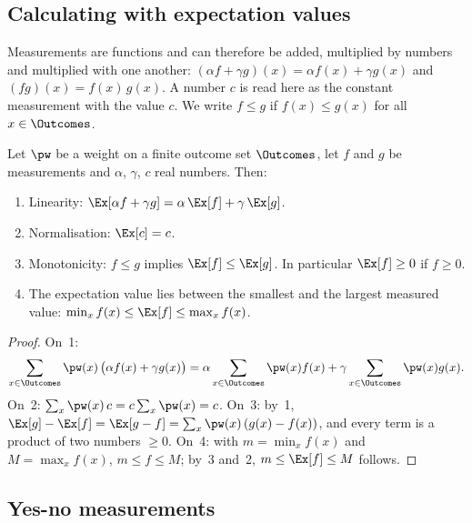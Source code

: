 \subsection{Calculating with expectation values}\label{c01.s2.2}

Measurements are functions and can therefore be added, multiplied by numbers and
multiplied with one another: $(\alpha f + \gamma g)(x) = \alpha f(x) + \gamma g(x)$ and
$(fg)(x) = f(x)\,g(x)$. A number $c$ is read here as the constant measurement with the
value $c$. We write $f \leq g$ if $f(x) \leq g(x)$ for all $x \in \Outcomes$.

\begin{proposition}\label{c01.prop.erwartung}
  Let $\pw$ be a weight on a finite outcome set $\Outcomes$, let $f$ and $g$ be
  measurements and $\alpha$, $\gamma$, $c$ real numbers. Then:
  \begin{enumerate}
    \item Linearity: $\Ex[\alpha f + \gamma g] = \alpha\, \Ex[f] + \gamma\, \Ex[g]$.
    \item Normalisation: $\Ex[c] = c$.
    \item Monotonicity: $f \leq g$ implies $\Ex[f] \leq \Ex[g]$. In particular
      $\Ex[f] \geq 0$ if $f \geq 0$.
    \item The expectation value lies between the smallest and the largest measured value:
      $\min_x f(x) \leq \Ex[f] \leq \max_x f(x)$.
  \end{enumerate}
\end{proposition}
\begin{proof}
  On~1:
  \begin{equation}\label{c01.eq.linear}
    \sum_{x \in \Outcomes} \pw(x)\,\bigl(\alpha f(x) + \gamma g(x)\bigr)
    = \alpha \sum_{x \in \Outcomes} \pw(x) f(x) + \gamma \sum_{x \in \Outcomes} \pw(x) g(x) .
  \end{equation}
  On~2: $\sum_x \pw(x)\, c = c \sum_x \pw(x) = c$. On~3: by~1,
  $\Ex[g] - \Ex[f] = \Ex[g - f] = \sum_x \pw(x)\,(g(x) - f(x))$, and every term is a
  product of two numbers $\geq 0$. On~4: with $m = \min_x f(x)$ and $M = \max_x f(x)$,
  $m \leq f \leq M$; by~3 and~2, $m \leq \Ex[f] \leq M$ follows.
\end{proof}

\subsection{Yes-no measurements}\label{c01.s2.3}

